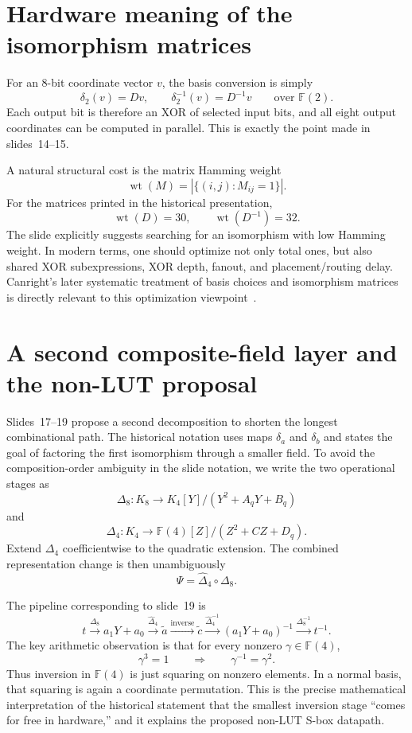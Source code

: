 \documentclass[11pt]{article}
\newcommand{\GF}{\mathbb{F}}
\begin{document}
\section{Hardware meaning of the isomorphism matrices}

For an 8-bit coordinate vector $v$, the basis conversion is simply
\[
  \delta_2(v)=Dv,
  \qquad
  \delta_2^{-1}(v)=D^{-1}v
  \qquad\text{over }\GF(2).
\]
Each output bit is therefore an XOR of selected input bits, and all eight
output coordinates can be computed in parallel.  This is exactly the point
made in slides~14--15.

A natural structural cost is the matrix Hamming weight
\[
  \operatorname{wt}(M)=
  |\{(i,j):M_{ij}=1\}|.
\]
For the matrices printed in the historical presentation,
\[
  \operatorname{wt}(D)=30,
  \qquad
  \operatorname{wt}(D^{-1})=32.
\]
The slide explicitly suggests searching for an isomorphism with low Hamming
weight.  In modern terms, one should optimize not only total ones, but also
shared XOR subexpressions, XOR depth, fanout, and placement/routing delay.
Canright's later systematic treatment of basis choices and isomorphism
matrices is directly relevant to this optimization viewpoint~\cite{canright2005}.

\section{A second composite-field layer and the non-LUT proposal}

Slides~17--19 propose a second decomposition to shorten the longest
combinational path.  The historical notation uses maps $\delta_a$ and
$\delta_b$ and states the goal of factoring the first isomorphism through a
smaller field.  To avoid the composition-order ambiguity in the slide
notation, we write the two operational stages as
\[
  \Delta_8:
  K_8\longrightarrow K_4[Y]/(Y^2+A_qY+B_q)
\]
and
\[
  \Delta_4:
  K_4\longrightarrow
  \GF(4)[Z]/(Z^2+CZ+D_q).
\]
Extend $\Delta_4$ coefficientwise to the quadratic extension.  The combined
representation change is then unambiguously
\[
  \Psi=\widehat{\Delta}_4\circ\Delta_8.
\]

The pipeline corresponding to slide~19 is
\[
  t
  \xrightarrow{\Delta_8}
  a_1Y+a_0
  \xrightarrow{\widehat{\Delta}_4}
  \widetilde a
  \xrightarrow{\mathrm{inverse}}
  \widetilde c
  \xrightarrow{\widehat{\Delta}_4^{-1}}
  (a_1Y+a_0)^{-1}
  \xrightarrow{\Delta_8^{-1}}
  t^{-1}.
\]
The key arithmetic observation is that for every nonzero
$\gamma\in\GF(4)$,
\[
  \gamma^3=1
  \qquad\Longrightarrow\qquad
  \gamma^{-1}=\gamma^2.
\]
Thus inversion in $\GF(4)$ is just squaring on nonzero elements.  In a normal
basis, that squaring is again a coordinate permutation.  This is the precise
mathematical interpretation of the historical statement that the smallest
inversion stage ``comes for free in hardware,'' and it explains the proposed
non-LUT S-box datapath.
\end{document}
